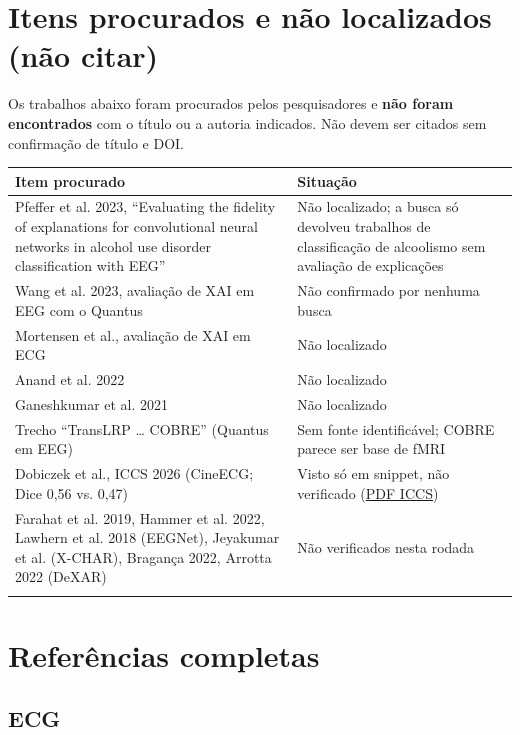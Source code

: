 \documentclass[11pt,a4paper]{article}
\begin{document}
\section{Itens procurados e não localizados (não citar)}

Os trabalhos abaixo foram procurados pelos pesquisadores e \textbf{não foram encontrados} com o título ou a autoria indicados. Não devem ser citados sem confirmação de título e DOI.

{\scriptsize\setlength{\tabcolsep}{3pt}
\begin{xltabular}{\linewidth}{>{\raggedright\arraybackslash}X>{\raggedright\arraybackslash}X}
\toprule
\textbf{Item procurado} & \textbf{Situação} \\
\midrule
\endhead
Pfeffer et al. 2023, ``Evaluating the fidelity of explanations for convolutional neural networks in alcohol use disorder classification with EEG'' & Não localizado; a busca só devolveu trabalhos de classificação de alcoolismo sem avaliação de explicações \\ \addlinespace[1pt]
Wang et al. 2023, avaliação de XAI em EEG com o Quantus & Não confirmado por nenhuma busca \\ \addlinespace[1pt]
Mortensen et al., avaliação de XAI em ECG & Não localizado \\ \addlinespace[1pt]
Anand et al. 2022 & Não localizado \\ \addlinespace[1pt]
Ganeshkumar et al. 2021 & Não localizado \\ \addlinespace[1pt]
Trecho ``TransLRP … COBRE'' (Quantus em EEG) & Sem fonte identificável; COBRE parece ser base de fMRI \\ \addlinespace[1pt]
Dobiczek et al., ICCS 2026 (CineECG; Dice 0,56 vs. 0,47) & Visto só em snippet, não verificado (\href{https://www.iccs-meeting.org/archive/iccs2026/papers/167860449.pdf}{PDF ICCS}) \\ \addlinespace[1pt]
Farahat et al. 2019, Hammer et al. 2022, Lawhern et al. 2018 (EEGNet), Jeyakumar et al. (X-CHAR), Bragança 2022, Arrotta 2022 (DeXAR) & Não verificados nesta rodada \\ \addlinespace[1pt]
\bottomrule
\end{xltabular}}




\section{Referências completas}

\subsection{ECG}
\end{document}
